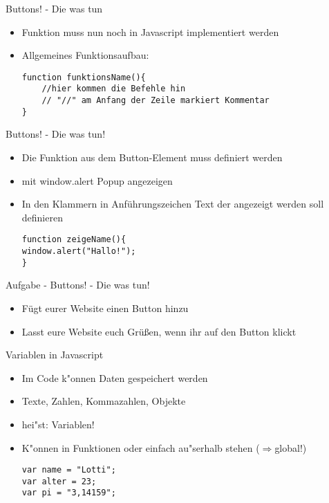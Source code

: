 \documentclass[18pt]{beamer}
\begin{document}
\begin{frame}[fragile]{Buttons! - Die was tun}
\begin {itemize}
\item Funktion muss nun noch in Javascript implementiert werden
\item Allgemeines Funktionsaufbau:
\begin{lstlisting}
function funktionsName(){
	//hier kommen die Befehle hin
	// "//" am Anfang der Zeile markiert Kommentar
}
\end{lstlisting}
\end {itemize}
\end{frame}




\begin{frame}[fragile]{Buttons! - Die was tun!}
\begin {itemize}
\item Die Funktion aus dem Button-Element muss definiert werden
\item  mit window.alert Popup angezeigen
\item In den Klammern in Anführungszeichen Text der angezeigt werden soll definieren
\begin{lstlisting}
function zeigeName(){
window.alert("Hallo!");
}
\end{lstlisting}
\end {itemize}
\end{frame}



\begin{frame}[fragile]{Aufgabe - Buttons! - Die was tun!}
\begin {itemize}
\item Fügt eurer Website einen Button hinzu
\item Lasst eure Website euch Grüßen, wenn ihr auf den Button klickt
\end {itemize}
\end{frame}


\begin{frame}[fragile]{Variablen in Javascript}
\begin {itemize}
\item Im Code k"onnen Daten gespeichert werden
\item Texte, Zahlen, Kommazahlen, Objekte
\item hei"st: Variablen! 
\item K"onnen in Funktionen oder einfach au"serhalb stehen ($\Rightarrow$global!)
\begin{lstlisting}
var name = "Lotti";
var alter = 23;
var pi = "3,14159";
\end{lstlisting}
\end {itemize}
\end{frame}
\end{document}
